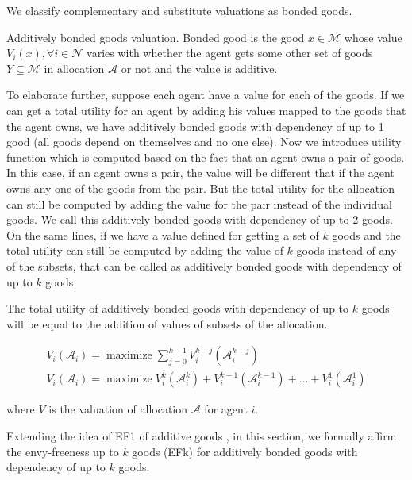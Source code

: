 We classify complementary and substitute valuations as bonded goods.

\begin{definition}{Additively bonded goods valuation.}
Bonded good is the good $x \in \mathcal{M}$ whose value $V_i(x), \forall i \in \mathcal{N}$ varies with whether the agent gets some other set of goods $Y \subseteq \mathcal{M}$ in allocation $\mathcal{A}$ or not and the value is additive.
\end{definition}

To elaborate further, suppose each agent have a value for each of the goods. If we can get a total utility for an agent by adding his values mapped to the goods that the agent owns, we have additively bonded goods with dependency of up to 1 good (all goods depend on themselves and no one else). Now we introduce utility function which is computed based on the fact that an agent owns a pair of goods. In this case, if an agent owns a pair, the value will be different that if the agent owns any one of the goods from the pair. But the total utility for the allocation can still be computed by adding the value for the pair instead of the individual goods. We call this additively bonded goods with dependency of up to 2 goods. On the same lines, if we have a value defined for getting a set of $k$ goods and the total utility can still be computed by adding the value of $k$ goods instead of any of the subsets, that can be called as additively bonded goods with dependency of up to $k$ goods.

The total utility of additively bonded goods with dependency of up to $k$ goods will be equal to the addition of values of subsets of the allocation.

\begin{equation}
\label{eq_abgv}
\begin{gathered}
    V_i(\mathcal{A}_i) = \operatorname{maximize} \sum_{j=0}^{k-1} V^{k-j}_i(\mathcal{A}^{k-j}_i) \\
    V_i(\mathcal{A}_i) = \operatorname{maximize} V^k_i(\mathcal{A}^k_i) + V^{k-1}_i(\mathcal{A}^{k-1}_i) + ... + V^1_i(\mathcal{A}^{1}_i)
\end{gathered}
\end{equation}

where $V$ is the valuation of allocation $\mathcal{A}$ for agent $i$. 

Extending the idea of EF1 of additive goods \cite{caragiannis2016unreasonable}, in this section, we formally affirm the envy-freeness up to $k$ goods (EFk) for additively bonded goods with dependency of up to $k$ goods.

